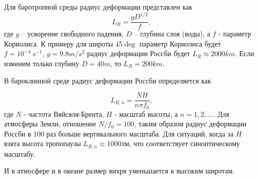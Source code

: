 Для баротропной среды радиус деформации представлен как 
\begin{equation}
    L_R = \frac{{gD}^{1/2}}{f},
\end{equation}
где $g$ -- ускорение свободного падения, $D$ -- глубина слоя (воды), а $f$ - параметр Кориолиса. К примеру для широты 45$\deg$ параметр Кориолиса будет $f=10^{-4} \: s^{-1}$, $g=9.8 m/s^2$ радиус деформации Россби будет $L_R\approx2000 km$. Если изменим только глубину $D=40 m$, то $L_R = 200 km$.

В бароклинной среде радиус деформации Россби определяется как 

\begin{equation}
    L_{R,n} = \frac{NH}{n \pi f_0},
\end{equation}
где $N$ - частота Вяйсяля-Брента, $H$ - масштаб высоты, а $n=1,2,...$. Для атмосферы Земли, отношение $N/f_0=100$, таким образом радиус деформации Россби в 100 раз больше вертикального масштаба. Для ситуаций, когда за $H$ взята высота тропопаузы $L_{R,n} \approx 1000 $лм, что соответствует синоптическому масштабу.  

И в атмосфере и в океане размер вихря уменьшается к высоким широтам.